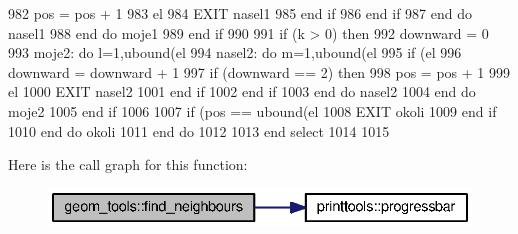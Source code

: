 \begin{DoxyCode}
982                                                 pos = pos + 1
983                                                 el%
984                                                 \textcolor{keywordflow}{EXIT} nasel1
985 \textcolor{keywordflow}{                                              end if}
986 \textcolor{keywordflow}{                                            end if}
987 \textcolor{keywordflow}{                                  end do} nasel1
988 \textcolor{keywordflow}{                          end do} moje1
989 \textcolor{keywordflow}{                        end if}
990 
991                         \textcolor{keywordflow}{if} (k > 0) \textcolor{keywordflow}{then}
992                           downward = 0
993                           moje2: \textcolor{keywordflow}{do} l=1,ubound(el%
994                                   nasel2: \textcolor{keywordflow}{do} m=1,ubound(el%
995                                             \textcolor{keywordflow}{if} (el%
996                                               downward = downward + 1
997                                               \textcolor{keywordflow}{if} (downward == 2) \textcolor{keywordflow}{then} 
998                                                 pos = pos + 1
999                                                 el%
1000                                                 \textcolor{keywordflow}{EXIT} nasel2
1001 \textcolor{keywordflow}{                                              end if}
1002 \textcolor{keywordflow}{                                            end if}
1003 \textcolor{keywordflow}{                                  end do} nasel2 
1004 \textcolor{keywordflow}{                          end do} moje2
1005 \textcolor{keywordflow}{                        end if}
1006 
1007                         \textcolor{keywordflow}{if} (pos == ubound(el%
1008                           \textcolor{keywordflow}{EXIT} okoli
1009 \textcolor{keywordflow}{                        end if}
1010 \textcolor{keywordflow}{              end do} okoli
1011 \textcolor{keywordflow}{            end do}
1012             
1013 \textcolor{keywordflow}{        end select}
1014       
1015 
\end{DoxyCode}


Here is the call graph for this function\+:\nopagebreak
\begin{figure}[H]
\begin{center}
\leavevmode
\includegraphics[width=334pt]{namespacegeom__tools_a28a5bc6f02c538f8998441d9a251a8d0_cgraph}
\end{center}
\end{figure}




